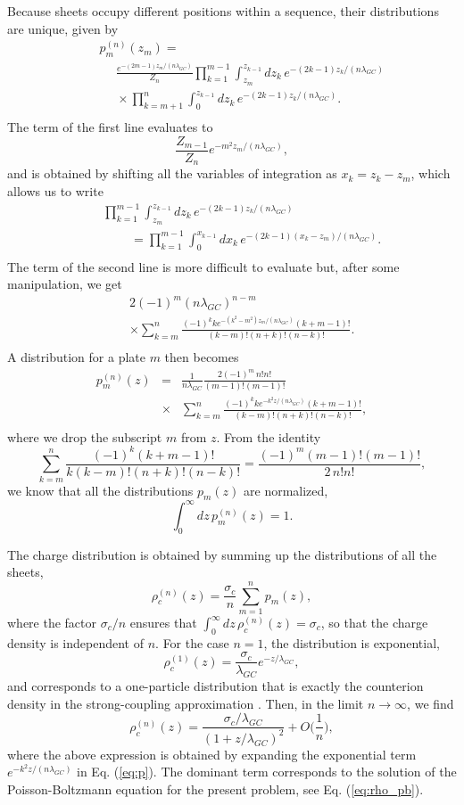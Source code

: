 \documentclass[pre,twocolumn,graphicx]{revtex4-1}
\newcommand{\ba}{\begin{eqnarray}}
\newcommand{\ea}{\end{eqnarray}}
\newcommand{\be}{\begin{equation}}
\newcommand{\ee}{\end{equation}}
\begin{document}
Because sheets occupy different positions within a sequence, their distributions are unique, given by 
\ba
&& p_{m}^{(n)}(z_m)  = \nonumber\\
&&~~~~~~\frac{e^{- (2m-1)z_m / (n\lambda_{GC})}  }{Z_n} 
\prod_{k=1}^{m-1} \int_{z_m}^{z_{k-1}} \!\!\!\!\! dz_k\, e^{-(2k-1) z_k/(n\lambda_{GC})} \nonumber\\
&&~~~~~~\times \prod_{k=m+1}^{n} \int_{0}^{z_{k-1}} \!\!\!\!\! dz_k\, e^{-(2k-1) z_k/(n\lambda_{GC})}.  
\nonumber\\
\label{eq:p}
\ea
The term of the first line evaluates to 
\be
\frac{Z_{m-1}}{Z_n} e^{-m^2 z_m/(n\lambda_{GC})},
\ee
and is obtained by shifting all the variables of integration as $x_k = z_k - z_m$, which allows us to write
\ba
&&\prod_{k=1}^{m-1} \int_{z_m}^{z_{k-1}} \!\!\!\!\!\! dz_k\, e^{-(2k-1) z_k/(n\lambda_{GC})}  \nonumber\\
&& ~~~~~~~~~~ =  \prod_{k=1}^{m-1} \int_{0}^{x_{k-1}} \!\!\!\!\!\! dx_k\, e^{-(2k-1) (x_k-z_m)/(n\lambda_{GC})}.  
\nonumber\\
\ea
The term of the second line is more difficult to evaluate but, after some manipulation, we get 
\ba
&&2(-1)^{m}
(n\lambda_{GC})^{n-m} \nonumber\\
&&\times \sum_{k=m}^n \! \frac{(-1)^{k} k e^{-(k^2-m^2)z_m/(n\lambda_{GC})} (k+m-1)!}{(k-m)!(n+k)!(n-k)!}.  
\nonumber\\
\ea
A distribution for a plate $m$ then becomes 
\ba
p_m^{(n)}(z) &=& \frac{1}{n\lambda_{GC}}\frac{2 (-1)^{m} \, n!n!  } {(m-1)!(m-1)!} \nonumber\\
&\times& \sum_{k=m}^n \frac{(-1)^{k} k e^{-k^2 z/(n\lambda_{GC})} (k+m-1)!}{(k-m)!(n+k)!(n-k)!}, 
\nonumber\\
\label{eq:p}
\ea
where we drop the subscript $m$ from $z$. From the identity 
\be
\sum_{k=m}^n \frac{(-1)^{k} (k+m-1)!}{k(k-m)!(n+k)!(n-k)!} = \frac{(-1)^m(m-1)!(m-1)!}{2\, n!n!}, 
\ee
we know that all the distributions $p_m(z)$ are normalized, 
\be
\int_0^{\infty} dz\, p_m^{(n)}(z) = 1. 
\ee

The charge distribution is obtained by summing up the distributions of all the sheets, 
\be
\rho_c^{(n)}(z) = \frac{\sigma_c}{n} \sum_{m=1}^n p_m(z), 
\label{eq:rho_n}
\ee
where the factor $\sigma_c/n$ ensures that $\int_0^{\infty}dz\,\rho_c^{(n)}(z)=\sigma_c$, so that 
the charge density is independent of $n$.
For the case $n=1$, the distribution is exponential, 
\be
\rho_c^{(1)}(z) = \frac{\sigma_c}{\lambda_{GC}} e^{-z/\lambda_{GC}},
\ee
and corresponds to a one-particle distribution that is exactly the counterion density in the strong-coupling 
approximation \cite{Rudi13}.  Then, in the limit $n\to\infty$, we find 
\be
\rho_c^{(n)}(z) = \frac{\sigma_c/\lambda_{GC}}{(1+z/\lambda_{GC})^2} + O\bigg(\frac{1}{n}\bigg),
\ee
where the above expression is obtained by expanding the exponential term $e^{-k^2 z/(n\lambda_{GC})}$ 
in Eq. (\ref{eq:p}).  The dominant term corresponds to the solution of the Poisson-Boltzmann equation 
for the present problem, see Eq. (\ref{eq:rho_pb}).  
\end{document}
